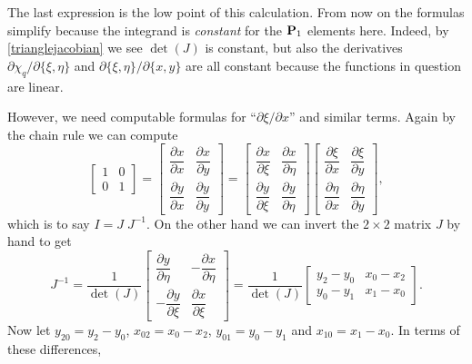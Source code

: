The last expression is the low point of this calculation.  From now on the formulas simplify because the integrand is \emph{constant} for the $\mathbf{P}_1$ elements here.  Indeed, by \eqref{trianglejacobian} we see $\det(J)$ is constant, but also the derivatives $\partial \chi_q/\partial\{\xi,\eta\}$ and $\partial\{\xi,\eta\}/\partial\{x,y\}$ are all constant because the functions in question are linear.

However, we need computable formulas for ``$\partial \xi/\partial x$'' and similar terms.  Again by the chain rule we can compute
\begin{equation*}
\begin{bmatrix}
    1 & 0 \\[0.2em]
    0 & 1
\end{bmatrix}
=\begin{bmatrix}
    \dfrac{\partial x}{\partial x} & \dfrac{\partial x}{\partial y} \\[1.0em]
    \dfrac{\partial y}{\partial x} & \dfrac{\partial y}{\partial y}
\end{bmatrix}
=
\begin{bmatrix}
    \dfrac{\partial x}{\partial \xi} & \dfrac{\partial x}{\partial \eta} \\[1.0em]
    \dfrac{\partial y}{\partial \xi} & \dfrac{\partial y}{\partial \eta}
\end{bmatrix}
\begin{bmatrix}
    \dfrac{\partial \xi}{\partial x} & \dfrac{\partial \xi}{\partial y} \\[1.0em]
    \dfrac{\partial \eta}{\partial x} & \dfrac{\partial \eta}{\partial y}
\end{bmatrix},
\end{equation*}
which is to say $I=J\; J^{-1}$.  On the other hand we can invert the $2\times 2$ matrix $J$ by hand to get
\begin{equation}
J^{-1}
= \frac{1}{\det(J)}
\begin{bmatrix}
    \dfrac{\partial y}{\partial \eta} & -\dfrac{\partial x}{\partial \eta} \\[1.0em]
    -\dfrac{\partial y}{\partial \xi} & \dfrac{\partial x}{\partial \xi}
\end{bmatrix}
= \frac{1}{\det(J)}
\begin{bmatrix}
    y_2-y_0 & x_0-x_2 \\
    y_0-y_1 & x_1-x_0
\end{bmatrix}.  \label{Jinverse}
\end{equation}
Now let $y_{20}=y_2-y_0$, $x_{02}=x_0-x_2$, $y_{01}=y_0-y_1$ and $x_{10}=x_1-x_0$.  In terms of these differences,
